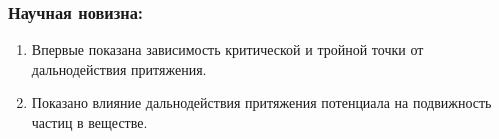 \documentclass[pdf,hyperref={unicode}]{beamer}
\begin{document}
\begin{frame}
	\transdissolve[duration=0.2]
	\frametitle{Научная новизна:}
	\footnotesize{
\begin{enumerate}
    \item Впервые показана зависимость критической и тройной точки от дальнодействия притяжения.
    \item Показано влияние дальнодействия притяжения потенциала на подвижность частиц в веществе. 
\end{enumerate}
	}
\end{frame}





\subsection{ }


\begin{frame}
\end{frame}
\end{document}
